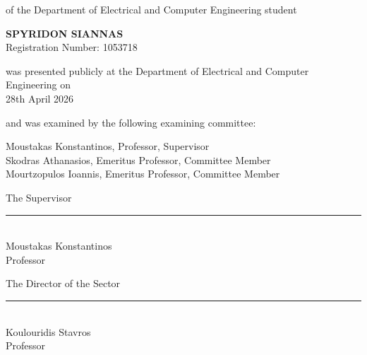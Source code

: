 \begin{center}
  of the Department of Electrical and Computer Engineering student
\end{center}

\vspace{0.5em}

\begin{center}
  {\large\bfseries SPYRIDON SIANNAS}\\[0.4em]
  Registration Number: 1053718
\end{center}

\vspace{0.6em}

\begin{center}
  was presented publicly at the Department of Electrical and Computer Engineering on\\
  28th April 2026
\end{center}

\vspace{0.4em}

\begin{center}
  and was examined by the following examining committee:
\end{center}

\vspace{0.5em}

\begin{center}
  Moustakas Konstantinos, Professor, Supervisor\\[0.3em]
  Skodras Athanasios, Emeritus Professor, Committee Member\\[0.3em]
  Mourtzopulos Ioannis, Emeritus Professor, Committee Member
\end{center}

\vspace{1.2cm}

\noindent
\begin{minipage}[t]{0.46\linewidth}
  The Supervisor\\[1.6cm]
  \rule{5.5cm}{0.4pt}\\[0.4em]
  Moustakas Konstantinos\\
  Professor
\end{minipage}%
\hfill
\begin{minipage}[t]{0.46\linewidth}
  The Director of the Sector\\[1.6cm]
  \rule{5.5cm}{0.4pt}\\[0.4em]
  Koulouridis Stavros\\
  Professor
\end{minipage}

